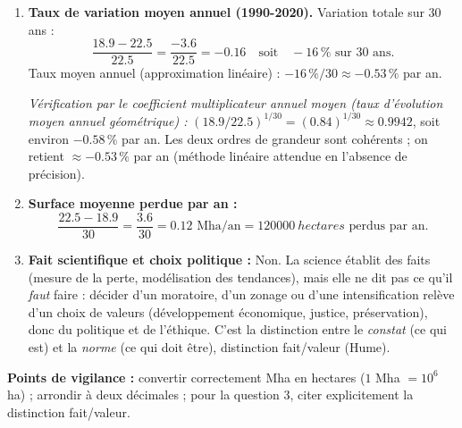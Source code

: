 \documentclass[11pt]{article}
\newcommand{\cle}[1]{{\popxbold\color{popdark}#1}}
\begin{document}
\begin{corrige}
\begin{enumerate}
    \item \textbf{Taux de variation moyen annuel (1990-2020).} Variation totale sur 30 ans :
    \[ \frac{\num{18,9} - \num{22,5}}{\num{22,5}} = \frac{-\num{3,6}}{\num{22,5}} = -\num{0,16} \quad \text{soit} \quad -\num{16}\,\% \text{ sur 30 ans.} \]
    Taux moyen annuel (approximation linéaire) : $-\num{16}\,\% / 30 \approx -\num{0,53}\,\%$ par an.
    
    \emph{Vérification par le coefficient multiplicateur annuel moyen (taux d'évolution moyen annuel géométrique) :} $(\num{18,9}/\num{22,5})^{1/30} = (\num{0,84})^{1/30} \approx \num{0,9942}$, soit environ $-\num{0,58}\,\%$ par an. Les deux ordres de grandeur sont cohérents ; on retient $\approx -\num{0,53}\,\%$ par an (méthode linéaire attendue en l'absence de précision).
    \item \textbf{Surface moyenne perdue par an :}
    \[ \frac{\num{22,5} - \num{18,9}}{30} = \frac{\num{3,6}}{30} = \num{0,12} \text{ Mha/an} = \SI{120000}{hectares} \text{ perdus par an.} \]
    \item \textbf{Fait scientifique et choix politique :} Non. La science établit des \cle{faits} (mesure de la perte, modélisation des tendances), mais elle ne dit pas ce qu'il \emph{faut} faire : décider d'un moratoire, d'un zonage ou d'une intensification relève d'un \cle{choix de valeurs} (développement économique, justice, préservation), donc du politique et de l'éthique. C'est la distinction entre le \emph{constat} (ce qui est) et la \emph{norme} (ce qui doit être), distinction fait/valeur (Hume).
\end{enumerate}
\textbf{Points de vigilance :} convertir correctement Mha en hectares ($1$ Mha $= 10^{6}$ ha) ; arrondir à deux décimales ; pour la question 3, citer explicitement la distinction fait/valeur.
\end{corrige}
\end{document}
